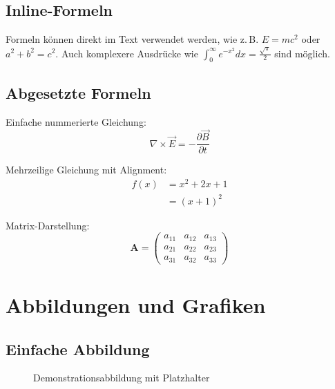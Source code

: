 \subsection{Inline-Formeln}
\label{subsec:inline_formeln}

Formeln können direkt im Text verwendet werden, wie z.\,B. $E = mc^2$ oder $a^2 + b^2 = c^2$. Auch komplexere Ausdrücke wie $\int_{0}^{\infty} e^{-x^2} dx = \frac{\sqrt{\pi}}{2}$ sind möglich.

\subsection{Abgesetzte Formeln}
\label{subsec:abgesetzte_formeln}

Einfache nummerierte Gleichung:
\begin{equation}
	\nabla \times \vec{E} = -\frac{\partial \vec{B}}{\partial t}
	\label{eq:maxwell1}
\end{equation}

Mehrzeilige Gleichung mit Alignment:
\begin{align}
	f(x) & = x^2 + 2x + 1 \\
	     & = (x + 1)^2
	\label{eq:binomial}
\end{align}

Matrix-Darstellung:
\begin{equation}
	\mathbf{A} = \begin{pmatrix}
		a_{11} & a_{12} & a_{13} \\
		a_{21} & a_{22} & a_{23} \\
		a_{31} & a_{32} & a_{33}
	\end{pmatrix}
	\label{eq:matrix}
\end{equation}

\section{Abbildungen und Grafiken}
\label{sec:abbildungen_demo}

\subsection{Einfache Abbildung}
\label{subsec:einfache_abbildung}

\begin{figure}[h]
	\centering
	\caption{Demonstrationsabbildung mit Platzhalter}
	\label{fig:demo_abbildung}
\end{figure}

